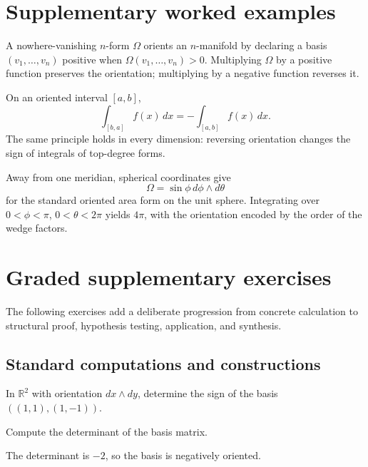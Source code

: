 \section{Supplementary worked examples}
\label{sec:vii10-pedagogy}

\begin{example}\label{ex:vii10-ped-01}
A nowhere-vanishing \(n\)-form \(\Omega\) orients an \(n\)-manifold by declaring a basis \((v_1,\ldots,v_n)\) positive when \(\Omega(v_1,\ldots,v_n)>0\).  Multiplying \(\Omega\) by a positive function preserves the orientation; multiplying by a negative function reverses it.
\end{example}

\begin{example}\label{ex:vii10-ped-02}
On an oriented interval \([a,b]\),
\[
\int_{[b,a]} f(x)\,dx=-\int_{[a,b]} f(x)\,dx.
\]
The same principle holds in every dimension: reversing orientation changes the sign of integrals of top-degree forms.
\end{example}

\begin{example}\label{ex:vii10-ped-03}
Away from one meridian, spherical coordinates give
\[
\Omega=\sin\phi\,d\phi\wedge d\theta
\]
for the standard oriented area form on the unit sphere.  Integrating over \(0<\phi<\pi\), \(0<\theta<2\pi\) yields \(4\pi\), with the orientation encoded by the order of the wedge factors.
\end{example}

\section{Graded supplementary exercises}
The following exercises add a deliberate progression from concrete calculation to structural proof, hypothesis testing, application, and synthesis.

\subsection*{Standard computations and constructions}

\begin{exercise}\label{exr:vii10-ped-01}
In \(\mathbb R^2\) with orientation \(dx\wedge dy\), determine the sign of the basis \(((1,1),(1,-1))\).
\end{exercise}
\begin{hint}
Compute the determinant of the basis matrix.
\end{hint}
\begin{solution}
The determinant is \(-2\), so the basis is negatively oriented.
\end{solution}

